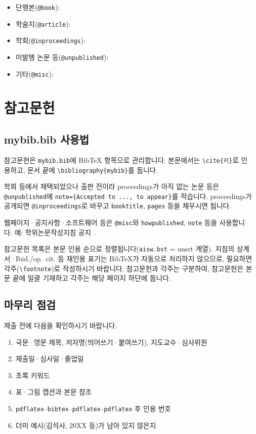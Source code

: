\documentclass[korean]{aisw}
\begin{document}
\begin{itemize}
    \item 단행본(\texttt{@book}):~\cite{shin2012sounds}
    \item 학술지(\texttt{@article}):~\cite{chen2022wavlm}
    \item 학회(\texttt{@inproceedings}):~\cite{chen2025f5, hong2008effects}
    \item 미발행 논문 등(\texttt{@unpublished}):~\cite{kim2026salt}
    \item 기타(\texttt{@misc}):~\cite{sogang2025aiswthesisguide}
\end{itemize}

\chapter{참고문헌}

\section{mybib.bib 사용법}

참고문헌은 \texttt{mybib.bib}에 BibTeX 항목으로 관리합니다.
본문에서는 \texttt{\textbackslash cite\{키\}}로 인용하고,
문서 끝에 \texttt{\textbackslash bibliography\{mybib\}}를 둡니다.

학회 등에서 채택되었으나 출판 전이라 proceedings가 아직 없는 논문 등은
\texttt{@unpublished}에 \texttt{note=\{Accepted to ..., to appear\}}를 적습니다.
proceedings가 공개되면 \texttt{@inproceedings}로 바꾸고
\texttt{booktitle}, \texttt{pages} 등을 채우시면 됩니다.

웹페이지·공지사항·소프트웨어 등은 \texttt{@misc}와
\texttt{howpublished}, \texttt{note} 등을 사용합니다.
예: 학위논문작성지침 공지~\cite{sogang2025aiswthesisguide}.

참고문헌 목록은 본문 인용 순으로 정렬됩니다(\texttt{aisw.bst} = unsrt 계열).
지침의 상계서·Ibid./op.~cit. 등 재인용 표기는 BibTeX가 자동으로 처리하지 않으므로,
필요하면 각주(\texttt{\textbackslash footnote})로 작성하시기 바랍니다.
참고문헌과 각주는 구분하여, 참고문헌은 본문 끝에 일괄 기재하고
각주는 해당 페이지 하단에 둡니다.

\section{마무리 점검}

제출 전에 다음을 확인하시기 바랍니다.
\begin{enumerate}
    \item 국문·영문 제목, 저자명(띄어쓰기·붙여쓰기), 지도교수·심사위원
    \item 제출일·심사일·졸업일
    \item 초록 키워드
    \item 표·그림 캡션과 본문 참조
    \item \texttt{pdflatex}--\texttt{bibtex}--\texttt{pdflatex}--\texttt{pdflatex} 후 인용 번호
    \item 더미 예시(김석사, 20XX 등)가 남아 있지 않은지
\end{enumerate}


\end{document}
